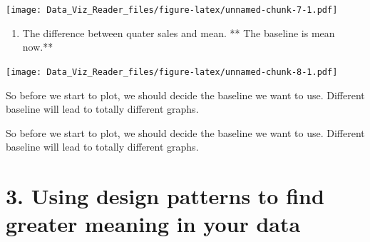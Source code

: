 \documentclass[]{book}
\newenvironment{Shaded}{\begin{snugshade}}{\end{snugshade}}
\newcommand{\KeywordTok}[1]{\textcolor[rgb]{0.13,0.29,0.53}{\textbf{#1}}}
\newcommand{\DataTypeTok}[1]{\textcolor[rgb]{0.13,0.29,0.53}{#1}}
\newcommand{\DecValTok}[1]{\textcolor[rgb]{0.00,0.00,0.81}{#1}}
\newcommand{\StringTok}[1]{\textcolor[rgb]{0.31,0.60,0.02}{#1}}
\newcommand{\CommentTok}[1]{\textcolor[rgb]{0.56,0.35,0.01}{\textit{#1}}}
\newcommand{\OtherTok}[1]{\textcolor[rgb]{0.56,0.35,0.01}{#1}}
\newcommand{\ControlFlowTok}[1]{\textcolor[rgb]{0.13,0.29,0.53}{\textbf{#1}}}
\newcommand{\OperatorTok}[1]{\textcolor[rgb]{0.81,0.36,0.00}{\textbf{#1}}}
\newcommand{\NormalTok}[1]{#1}
\providecommand{\tightlist}{%
  \setlength{\itemsep}{0pt}\setlength{\parskip}{0pt}}
\theoremstyle{definition}
\theoremstyle{definition}
\theoremstyle{definition}
\theoremstyle{remark}
\begin{document}
\texttt{[image: Data\_Viz\_Reader\_files/figure-latex/unnamed-chunk-7-1.pdf]}

\begin{enumerate}
\def\labelenumi{\arabic{enumi}.}
\setcounter{enumi}{4}
\tightlist
\item
  The difference between quater sales and mean. ** The baseline is mean
  now.**
\end{enumerate}

\begin{Shaded}
\end{Shaded}

\texttt{[image: Data\_Viz\_Reader\_files/figure-latex/unnamed-chunk-8-1.pdf]}

So before we start to plot, we should decide the baseline we want to
use. Different baseline will lead to totally different graphs.

So before we start to plot, we should decide the baseline we want to
use. Different baseline will lead to totally different
graphs.\citep{baseline}

\section{3. Using design patterns to find greater meaning in your
data}\label{using-design-patterns-to-find-greater-meaning-in-your-data}
\end{document}
